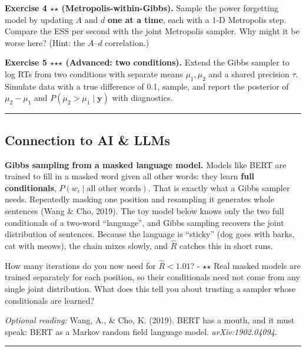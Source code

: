 \textbf{Exercise 4 \ensuremath{\star}\ensuremath{\star} (Metropolis-within-Gibbs).} Sample the power
forgetting model by updating \(A\) and \(d\) \textbf{one at a time},
each with a 1-D Metropolis step. Compare the ESS per second with the
joint Metropolis sampler. Why might it be worse here? (Hint: the
\(A\)--\(d\) correlation.)

\textbf{Exercise 5 \ensuremath{\star}\ensuremath{\star}\ensuremath{\star} (Advanced: two conditions).} Extend the Gibbs
sampler to log RTs from two conditions with separate means
\(\mu_1, \mu_2\) and a shared precision \(\tau\). Simulate data with a
true difference of 0.1, sample, and report the posterior of
\(\mu_2 - \mu_1\) and \(P(\mu_2 > \mu_1\mid\mathbf{y})\) with
diagnostics.

\begin{center}\rule{0.5\linewidth}{0.5pt}\end{center}

\subsection{Connection to AI \& LLMs}

\textbf{Gibbs sampling from a masked language model.} Models like BERT
are trained to fill in a masked word given all other words: they learn
\textbf{full conditionals}, \(P(w_i \mid \text{all other words})\). That
is exactly what a Gibbs sampler needs. Repeatedly masking one position
and resampling it generates whole sentences (Wang \& Cho, 2019). The toy
model below knows only the two full conditionals of a two-word
``language'', and Gibbs sampling recovers the joint distribution of
sentences. Because the language is ``sticky'' (dog goes with barks, cat
with meows), the chain mixes slowly, and \(\hat R\) catches this in
short runs.

How many iterations do you now need for \(\hat R < 1.01\)? - \ensuremath{\star}\ensuremath{\star} Real
masked models are trained separately for each position, so their
conditionals need not come from any single joint distribution. What does
this tell you about trusting a sampler whose conditionals are learned?

\emph{Optional reading:} Wang, A., \& Cho, K. (2019). BERT has a mouth,
and it must speak: BERT as a Markov random field language model.
\emph{arXiv:1902.04094}.

\begin{center}\rule{0.5\linewidth}{0.5pt}\end{center}

